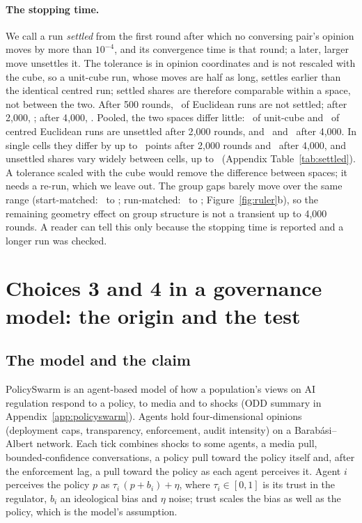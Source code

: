 \documentclass[11pt]{article}
\begin{document}
\paragraph{The stopping time.}
We call a run \emph{settled} from the first round after which no conversing pair's opinion moves by more than $10^{-4}$, and its convergence time is that round; a later, larger move unsettles it.
The tolerance is in opinion coordinates and is not rescaled with the cube, so a unit-cube run, whose moves are half as long, settles earlier than the identical centred run; settled shares are therefore comparable within a space, not between the two.
After 500 rounds, \VUnsettledFive\ of Euclidean runs are not settled; after 2{,}000, \VUnsettledTwo; after 4{,}000, \VUnsettledFour.
Pooled, the two spaces differ little: \VUnsettledTwoUnit\ of unit-cube and \VUnsettledTwoCentred\ of centred Euclidean runs are unsettled after 2{,}000 rounds, and \VUnsettledFourUnit\ and \VUnsettledFourCentred\ after 4{,}000.
In single cells they differ by up to \VSettledCellGapTwo\ points after 2{,}000 rounds and \VSettledCellGapFour\ after 4{,}000, and unsettled shares vary widely between cells, up to \VUnsettledMaxCell\ (Appendix Table~\ref{tab:settled}).
A tolerance scaled with the cube would remove the difference between spaces; it needs a re-run, which we leave out.
The group gaps barely move over the same range (start-matched: \VHorTzeroFive\ to \VHorTzeroFour; run-matched: \VHorRunFive\ to \VHorRunFour; Figure~\ref{fig:ruler}b), so the remaining geometry effect on group structure is not a transient up to 4{,}000 rounds.
A reader can tell this only because the stopping time is reported and a longer run was checked.

\section{Choices 3 and 4 in a governance model: the origin and the test}
\label{sec:case}

\subsection{The model and the claim}
PolicySwarm \citep{policyswarm} is an agent-based model of how a population's views on AI regulation respond to a policy, to media and to shocks (ODD summary in Appendix~\ref{app:policyswarm}).
Agents hold four-dimensional opinions (deployment caps, transparency, enforcement, audit intensity) on a Barab\'asi--Albert network.
Each tick combines shocks to some agents, a media pull, bounded-confidence conversations, a policy pull toward the policy itself and, after the enforcement lag, a pull toward the policy as each agent perceives it.
Agent $i$ perceives the policy $p$ as $\tau_i\,(p + b_i) + \eta$, where $\tau_i \in [0,1]$ is its trust in the regulator, $b_i$ an ideological bias and $\eta$ noise; trust scales the bias as well as the policy, which is the model's assumption.
\end{document}
